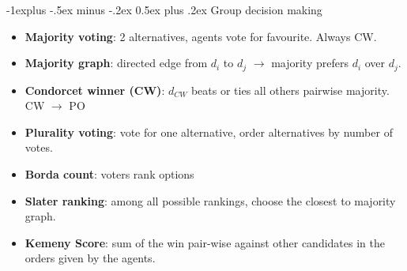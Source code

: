 \documentclass[10pt,a4paper,landscape]{article}
\makeatletter
\renewcommand{\subsection}{\@startsection{subsection}{2}{0mm}%
                                {-1explus -.5ex minus -.2ex}%
                                {0.5ex plus .2ex}%
                                {\normalfont\small\bfseries}}
\makeatother
\begin{document}
\begin{multicols*}{2}
\subsection{Group decision making}
\begin{itemize}
	\item \textbf{Majority voting}: 2 alternatives, agents vote for favourite. Always CW.
	\item \textbf{Majority graph}: directed edge from $d_i$ to $d_j$ $\rightarrow$ majority prefers $d_i$ over $d_j$.
	\item \textbf{Condorcet winner (CW)}: $d_{CW}$ beats or ties all others pairwise majority. CW $\rightarrow$ PO
	\item \textbf{Plurality voting}: vote for one alternative, order
	alternatives by number of votes.
	\item \textbf{Borda count}: voters rank options 
	\item \textbf{Slater ranking}: among all possible rankings, choose the closest to majority graph.
	\item \textbf{Kemeny Score}: sum of the win pair-wise against other candidates in the orders given by the agents.
\end{itemize}



\end{multicols*}
\end{document}

